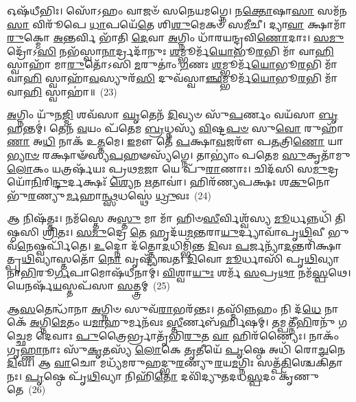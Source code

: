 𑌓𑌷᳴𑌧𑍀𑌭𑌿𑌃। 𑌸𑍋᳴\-𑌽𑌹𑌂 𑌵𑌾𑌜𑍞᳴ 𑌸𑌨𑍇𑌯𑌮𑌗𑍍𑌨𑍇। 𑌨\-\ul{𑌕𑍍𑌤𑍋}\-𑌷𑌾\-\ul{𑌸𑌾} 𑌸𑌮᳴𑌨\-\ul{𑌸𑌾} 𑌵𑌿𑌰𑍂᳴𑌪𑍇 \ul{𑌧𑌾}\-𑌪𑌯𑍇᳴\-\ul{𑌤𑍇} 𑌶𑌿\-\ul{𑌶𑍁}\-𑌮𑍇𑌕𑍞᳴ 𑌸\-\ul{𑌮𑍀}\-𑌚𑍀। 𑌦𑍍𑌯𑌾\-\ul{𑌵𑌾} 𑌕𑍍𑌷𑌾𑌮𑌾᳴ \ul{𑌰𑍁}\-𑌕𑍍𑌮𑍋 \ul{𑌅}\-𑌨𑍍𑌤𑌰𑍍𑌵𑌿 𑌭𑌾᳴𑌤𑌿 \ul{𑌦𑍇}\-𑌵𑌾 \ul{𑌅}\-𑌗𑍍𑌨𑌿𑌂 𑌧𑌾᳴𑌰𑌯𑌨𑍍𑌦𑍍𑌰𑌵𑌿\-\ul{𑌣𑍋}\-𑌦𑌾𑌃। \ul{𑌸}\-\-\ul{𑌮𑍁}\-𑌦𑍍𑌰𑍋᳴\-𑌽\-\ul{𑌸𑌿} 𑌨𑌭᳴𑌸𑍍𑌵𑌾\-\ul{𑌨𑌾}\-𑌰𑍍𑌦𑍍𑌰𑌦𑌾᳴𑌨𑍁𑌃 \ul{𑌶}\-𑌮𑍍𑌭𑍂𑌰𑍍𑌮᳴\-\ul{𑌯𑍋}\-𑌭𑍂\-\ul{𑌰}\-𑌭𑌿 𑌮𑌾᳴ 𑌵𑌾\-\ul{𑌹𑌿} 𑌸𑍍𑌵𑌾𑌹𑌾᳴ 𑌮𑌾\-\ul{𑌰𑍁}\-𑌤𑍋᳴\-𑌽𑌸𑌿 \ul{𑌮}\-𑌰𑍁𑌤𑌾𑌂॑ \ul{𑌗}\-𑌣𑌃 \ul{𑌶}\-𑌮𑍍𑌭𑍂𑌰𑍍𑌮᳴\-\ul{𑌯𑍋}\-𑌭𑍂\-\ul{𑌰}\-𑌭𑌿 𑌮𑌾᳴ 𑌵𑌾\-\ul{𑌹𑌿} 𑌸𑍍𑌵𑌾𑌹𑌾᳴\-\ul{𑌵}\-𑌸𑍍𑌯𑍁𑌰᳴\-\ul{𑌸𑌿} 𑌦𑍁𑌵᳴𑌸𑍍𑌵𑌾\-\ul{𑌞𑍍𑌛}\-𑌮𑍍𑌭𑍂𑌰𑍍𑌮᳴\-\ul{𑌯𑍋}\-𑌭𑍂\-\ul{𑌰}\-𑌭𑌿 𑌮𑌾᳴ 𑌵𑌾\-\ul{𑌹𑌿} 𑌸𑍍𑌵𑌾𑌹𑌾॑॥~(23)

{\anuvakamend[{𑌧𑌨𑍇॑\-\ul{𑌷𑍍𑌵}\-𑌪𑍋 𑌦𑍁𑌵᳴𑌸𑍍𑌵𑌾\-\ul{𑌞𑍍𑌛}\-𑌮𑍍𑌭𑍂𑌰𑍍𑌮᳴\-\ul{𑌯𑍋}\-𑌭𑍂\-\ul{𑌰}\-𑌭𑌿 \ul{𑌮𑌾} 𑌦𑍍𑌵𑍇 𑌚᳴}]}%

\-\ul{𑌅}\-𑌗𑍍𑌨𑌿𑌂 𑌯𑍁᳴𑌨\-\ul{𑌜𑍍𑌮𑌿} 𑌶𑌵᳴𑌸𑌾 \ul{𑌘𑍃}\-𑌤𑍇𑌨᳴ \ul{𑌦𑌿}\-𑌵𑍍𑌯𑍞 𑌸𑍁᳴\-\ul{𑌪}\-𑌰𑍍𑌣𑌂 𑌵𑌯᳴𑌸𑌾 \ul{𑌬𑍃}\-𑌹𑌨𑍍𑌤𑌮𑍍॑। 𑌤𑍇𑌨᳴ \ul{𑌵}\-𑌯𑌂 𑌪᳴𑌤𑍇𑌮 \ul{𑌬𑍍𑌰}\-𑌧𑍍𑌨𑌸𑍍𑌯᳴ \ul{𑌵𑌿}\-𑌷𑍍𑌟\-\ul{𑌪}\-\-\ul{𑍞} 𑌸𑍁\-\ul{𑌵𑍋} 𑌰𑍁𑌹𑌾᳴\-\ul{𑌣𑌾} 𑌅\-\ul{𑌧𑌿} 𑌨𑌾𑌕᳴ 𑌉\-\ul{𑌤𑍍𑌤}\-𑌮𑍇। \ul{𑌇}\-𑌮𑍗 𑌤𑍇᳴ \ul{𑌪}\-𑌕𑍍𑌷𑌾\-\ul{𑌵}\-𑌜𑌰𑍗᳴ 𑌪\-\ul{𑌤}\-𑌤𑍍𑌰𑌿\-\ul{𑌣𑍋} 𑌯𑌾\-\ul{𑌭𑍍𑌯𑌾}\-\-\ul{𑍞} 𑌰𑌕𑍍𑌷𑌾𑍟᳴𑌸𑍍𑌯\-\ul{𑌪}\-𑌹𑍟𑌸𑍍𑌯᳴𑌗𑍍𑌨𑍇। 𑌤𑌾\-𑌭𑍍𑌯𑌾𑌂॑ 𑌪𑌤𑍇𑌮 \ul{𑌸𑍁}\-𑌕𑍃𑌤𑌾᳴𑌮𑍁 \ul{𑌲𑍋}\-𑌕𑌂 𑌯𑌤𑍍𑌰𑌰𑍍\mbox{}𑌷᳴𑌯𑌃 𑌪𑍍𑌰𑌥\-\ul{𑌮}\-𑌜𑌾 𑌯𑍇 𑌪𑍁᳴\-\ul{𑌰𑌾}\-𑌣𑌾𑌃। 𑌚𑌿𑌦᳴𑌸𑌿 𑌸\-\ul{𑌮𑍁}\-𑌦𑍍𑌰𑌯𑍋᳴\-\ul{𑌨𑌿}\-𑌰𑌿\-\ul{𑌨𑍍𑌦𑍁}\-𑌰𑍍𑌦𑌕𑍍𑌷𑌃᳴ \ul{𑌶𑍍𑌯𑍇}\-𑌨 \ul{𑌋}\-𑌤𑌾𑌵𑌾॑। 𑌹𑌿𑌰᳴𑌣𑍍𑌯𑌪𑌕𑍍𑌷𑌃 𑌶\-\ul{𑌕𑍁}\-𑌨𑍋 𑌭𑍁᳴\-\ul{𑌰}\-𑌣𑍍𑌯𑍁\-\ul{𑌰𑍍𑌮}\-𑌹𑌾\-\ul{𑌨𑍍𑌥𑍍𑌸}\-𑌧𑌸𑍍𑌥𑍇॑ \ul{𑌧𑍍𑌰𑍁}\-𑌵𑌃~(24)

𑌆 𑌨𑌿𑌷᳴𑌤𑍍𑌤𑌃। 𑌨𑌮᳴𑌸𑍍𑌤𑍇 𑌅\-\ul{𑌸𑍍𑌤𑍁} 𑌮𑌾 𑌮𑌾᳴ 𑌹𑌿𑍞\-\ul{𑌸𑍀}\-𑌰𑍍𑌵𑌿𑌶𑍍𑌵᳴𑌸𑍍𑌯 \ul{𑌮𑍂}\-𑌰𑍍𑌧𑌨𑍍𑌨𑌧𑌿᳴ 𑌤𑌿𑌷𑍍𑌠𑌸𑌿 \ul{𑌶𑍍𑌰𑌿}\-𑌤𑌃। \ul{𑌸}\-\-\ul{𑌮𑍁}\-𑌦𑍍𑌰𑍇 \ul{𑌤𑍇} 𑌹𑍃𑌦᳴𑌯\-\ul{𑌮}\-𑌨𑍍𑌤𑌰𑌾\-\ul{𑌯𑍁}\-𑌰𑍍𑌦𑍍𑌯𑌾𑌵𑌾᳴𑌪𑍃\-\ul{𑌥𑌿}\-𑌵𑍀 𑌭𑍁𑌵᳴\-\ul{𑌨𑍇}\-𑌷𑍍𑌵𑌰𑍍𑌪𑌿᳴𑌤𑍇। \ul{𑌉}\-𑌦𑍍𑌨𑍋 𑌦᳴𑌤𑍍𑌤𑍋\-\ul{𑌦}\-𑌧𑌿𑌮𑍍𑌭𑌿᳴𑌨𑍍𑌤 \ul{𑌦𑌿}\-𑌵𑌃 \ul{𑌪}\-𑌰𑍍𑌜𑌨𑍍𑌯𑌾᳴\-\ul{𑌦}\-𑌨𑍍𑌤𑌰𑌿᳴𑌕𑍍𑌷𑌾𑌤𑍍𑌪𑍃\-\ul{𑌥𑌿}\-𑌵𑍍𑌯𑌾𑌸𑍍𑌤𑌤𑍋᳴ \ul{𑌨𑍋} 𑌵𑍃𑌷𑍍𑌟𑍍𑌯𑌾᳴𑌵𑌤। \ul{𑌦𑌿}\-𑌵𑍋 \ul{𑌮𑍂}\-𑌰𑍍𑌧𑌾𑌸𑌿᳴ 𑌪𑍃\-\ul{𑌥𑌿}\-𑌵𑍍𑌯𑌾 𑌨𑌾\-\ul{𑌭𑌿}\-𑌰𑍂\-\ul{𑌰𑍍𑌗}\-𑌪𑌾𑌮𑍋𑌷᳴𑌧𑍀𑌨𑌾𑌮𑍍। \ul{𑌵𑌿}\-𑌶𑍍𑌵𑌾\-\ul{𑌯𑍁𑌃} 𑌶𑌰𑍍𑌮᳴ \ul{𑌸}\-𑌪𑍍𑌰\-\ul{𑌥𑌾} 𑌨𑌮᳴\-\ul{𑌸𑍍𑌪}\-𑌥𑍇। 𑌯𑍇𑌨𑌰𑍍\mbox{}𑌷᳴\-\ul{𑌯}\-𑌸𑍍𑌤𑌪᳴𑌸𑌾 \ul{𑌸}\-𑌤𑍍𑌤𑍍𑌰𑌮𑍍~(25)

𑌆\-\ul{𑌸}\-𑌤𑍇𑌨𑍍𑌧𑌾᳴𑌨𑌾 \ul{𑌅}\-𑌗𑍍𑌨𑌿𑍞 𑌸𑍁𑌵᳴\-\ul{𑌰𑌾}\-𑌭𑌰᳴𑌨𑍍𑌤𑌃। 𑌤𑌸𑍍𑌮𑌿᳴\-\ul{𑌨𑍍𑌨}\-𑌹𑌂 𑌨𑌿 𑌦᳴\-\ul{𑌧𑍇} 𑌨𑌾𑌕𑍇᳴ \ul{𑌅}\-𑌗𑍍𑌨𑌿\-\ul{𑌮𑍇}\-𑌤𑌂 𑌯\-\ul{𑌮𑌾}\-𑌹𑍁𑌰𑍍𑌮𑌨᳴𑌵𑌃 \ul{𑌸𑍍𑌤𑍀}\-𑌰𑍍𑌣𑌬᳴𑌰𑍍\mbox{}𑌹𑌿𑌷𑌮𑍍। 𑌤𑌮𑍍𑌪𑌤𑍍𑌨𑍀᳴\-\ul{𑌭𑌿}\-𑌰𑌨𑍁᳴ 𑌗𑌚𑍍𑌛𑍇𑌮 𑌦𑍇𑌵𑌾𑌃 \ul{𑌪𑍁}\-𑌤𑍍𑌰𑍈𑌰𑍍𑌭𑍍𑌰𑌾𑌤𑍃᳴𑌭𑌿\-\ul{𑌰𑍁}\-𑌤 \ul{𑌵𑌾} 𑌹𑌿𑌰᳴𑌣𑍍𑌯𑍈𑌃। 𑌨𑌾𑌕𑌂᳴ 𑌗𑍃\-\ul{𑌹𑍍𑌣𑌾}\-𑌨𑌾𑌃 𑌸𑍁᳴\-\ul{𑌕𑍃}\-𑌤𑌸𑍍𑌯᳴ \ul{𑌲𑍋}\-𑌕𑍇 \ul{𑌤𑍃}\-𑌤𑍀𑌯𑍇᳴ \ul{𑌪𑍃}\-𑌷𑍍𑌠𑍇 𑌅𑌧𑌿᳴ 𑌰𑍋\-\ul{𑌚}\-𑌨𑍇 \ul{𑌦𑌿}\-𑌵𑌃। 𑌆 \ul{𑌵𑌾}\-𑌚𑍋 𑌮𑌧𑍍𑌯᳴𑌮𑌰𑍁𑌹𑌦𑍍𑌭𑍁\-\ul{𑌰}\-𑌣𑍍𑌯𑍁\-\ul{𑌰}\-𑌯\-\ul{𑌮}\-𑌗𑍍𑌨𑌿𑌃 𑌸𑌤𑍍𑌪᳴\-\ul{𑌤𑌿}\-𑌶𑍍𑌚𑍇𑌕𑌿᳴𑌤𑌾𑌨𑌃। \ul{𑌪𑍃}\-𑌷𑍍𑌠𑍇 𑌪𑍃᳴\-\ul{𑌥𑌿}\-𑌵𑍍𑌯𑌾 𑌨𑌿𑌹𑌿᳴\-\ul{𑌤𑍋} 𑌦𑌵𑌿᳴𑌦𑍍𑌯𑍁𑌤𑌦𑌧\-\ul{𑌸𑍍𑌪}\-𑌦𑌂 𑌕𑍃᳴𑌣𑍁𑌤𑍇~(26)


